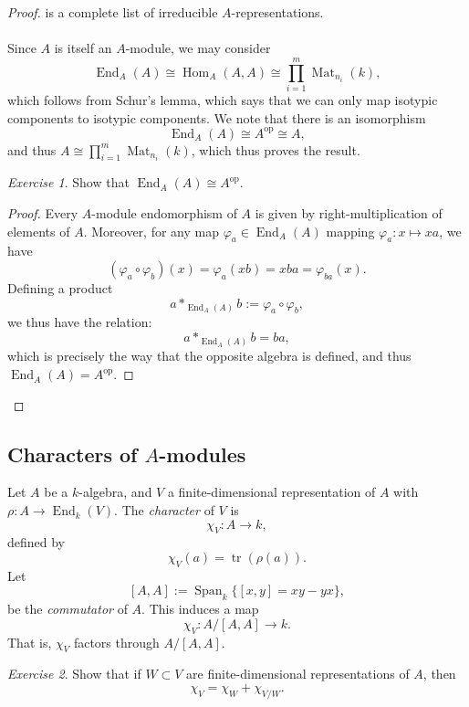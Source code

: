 \documentclass[a4paper]{report}
\theoremstyle{definition}
\theoremstyle{remark}
\theoremstyle{proposition}
\theoremstyle{conjecture}
\theoremstyle{lemma}
\theoremstyle{corollary}
\theoremstyle{exercise}
\newtheorem{exercise}{Exercise}
\theoremstyle{example}
\newcommand{\on}{\operatorname}
\begin{document}
\begin{proof}
    is a complete list of irreducible $A$-representations.\\\\
    Since $A$ is itself an $A$-module, we may consider
    $$\on{End}_A(A) \cong \on{Hom}_A(A,A) \cong \prod_{i=1}^m\on{Mat}_{n_i}(k),$$
    which follows from Schur's lemma, which says that we can only map isotypic 
    components to isotypic components.
    We note that there is an isomorphism 
    $$\on{End}_A(A) \cong A^{\on{op}} \cong A,$$
    and thus $A \cong \prod_{i=1}^m\on{Mat}_{n_i}(k)$, which thus proves the 
    result.
    \begin{exercise}
        Show that $\on{End}_A(A) \cong A^{\on{op}}$.
    \end{exercise}
    \begin{proof}
        Every $A$-module endomorphism of $A$ is given by right-multiplication
        of elements of $A$. Moreover, for any map $\varphi_a \in \on{End}_A(A)$
        mapping $\varphi_a : x\mapsto xa$, we have 
        $$(\varphi_a \circ \varphi_b)(x) = \varphi_a(xb) = xba = \varphi_{ba}(x).$$
        Defining a product $$a \ast_{\on{End}_A(A)} b := \varphi_a\circ \varphi_b,$$
        we thus have the relation:
        $$a \ast_{\on{End}_A(A)} b = ba,$$
        which is precisely the way that the opposite algebra is defined, 
        and thus $\on{End}_A(A) = A^{\on{op}}$.
    \end{proof}
\end{proof}

\subsection{Characters of $A$-modules}

Let $A$ be a $k$-algebra, and $V$ a finite-dimensional representation of 
$A$ with $\rho  :A \to \on{End}_k(V)$.
The \emph{character} of $V$ is
$$\chi_V : A \longrightarrow k,$$ defined by 
$$\chi_V(a) = \on{tr}(\rho(a)).$$
Let $$[A,A] := \on{Span}_k\lbrace [x,y] = xy-yx\rbrace,$$
be the \emph{commutator} of $A$. This induces a map
$$\chi_V : A/[A,A] \longrightarrow k.$$
That is, $\chi_V$ factors through $A/[A,A]$.

\begin{exercise}
    Show that if $W\subset V$ are finite-dimensional representations of $A$,
    then $$\chi_V = \chi_W + \chi_{V/W}.$$
\end{exercise}
\end{document}
